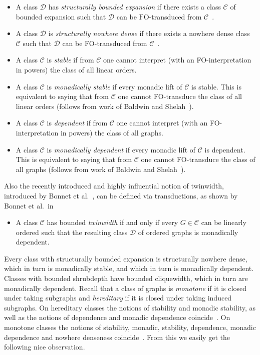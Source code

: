 \documentclass[1p,number,a4paper]{elsarticle}
\theoremstyle{remark}
\newcommand{\Cc}{\mathscr{C}}
\newcommand{\Dd}{\mathscr{D}}
\renewcommand{\FO}{\mathrm{FO}}
\begin{document}
\begin{itemize}
    \item A class $\Dd$ has \emph{structurally bounded expansion} if there exists a class $\Cc$ of bounded expansion such that $\Dd$ can be $\FO$-transduced from $\Cc$~\cite{gajarsky2020first}. 
    \item A class $\Dd$ is \emph{structurally nowhere dense} if there exists a nowhere dense class $\Cc$ such that $\Dd$ can be FO-transduced from $\Cc$~\cite{gajarsky2020first}. 
    \item A class $\Cc$ is \emph{stable} if from $\Cc$ one cannot interpret (with an FO-interpretation in powers) the class of all linear orders. 
    \item A class $\Cc$ is \emph{monadically stable} if every monadic lift of $\Cc$ is stable. 
    This is equivalent to saying that from $\Cc$ one cannot 
    FO-transduce the class of all linear orders (follows from work of Baldwin and Shelah~\cite{baldwin1985second}). 
    \item A class $\Cc$ is \emph{dependent} if from $\Cc$ one cannot interpret (with an FO-interpretation in powers) the class of all graphs. 
    \item A class $\Cc$ is \emph{monadically dependent} if every monadic lift of $\Cc$ is dependent. 
    This is equivalent to saying that from
    $\Cc$ one cannot FO-transduce the class of all graphs (follows from work of Baldwin and Shelah~\cite{baldwin1985second}).  
\end{itemize}

Also the recently introduced and highly influential notion of twinwidth, introduced by Bonnet et al.~\cite{bonnet2021twin}, can be defined via transductions, as shown by Bonnet et al.~in~\cite{bonnet2024twin}  
\begin{itemize}
    \item A class $\Cc$ has bounded \emph{twinwidth} if and only if every $G\in \Cc$ can be linearly ordered such that the resulting class $\Dd$ of ordered graphs is monadically dependent. 
\end{itemize}

Every class with structurally bounded expansion is structurally nowhere dense, which in turn is monadically stable, and which in turn is monadically dependent. 
Classes with bounded shrubdepth have bounded cliquewidth, which in turn are monadically dependent. 
Recall that a class of graphs is \emph{monotone} if it is closed under taking subgraphs and \emph{hereditary} if it is closed under taking induced subgraphs. 
On hereditary classes the notions of stability and monadic stability, as well as the notions of dependence and monadic dependence coincide~\cite{braunfeld2021characterizations}. 
On monotone classes the notions of stability, monadic, stability, dependence, monadic dependence and nowhere denseness coincide~\cite{adler2014interpreting}. 
\pagebreak
From this we easily get the following nice observation. 
\end{document}

